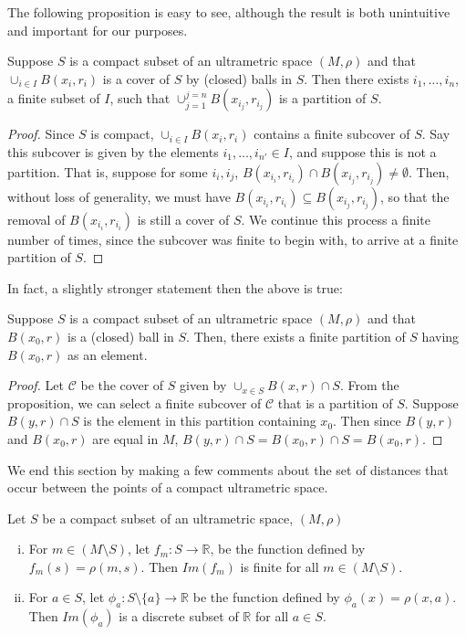The following proposition is  easy to see, although the result is both unintuitive and important for our purposes. \\

\begin{proposition}
Suppose $S$ is a compact subset of an ultrametric space $(M, \rho)$ and that $\cup_{i \in I} B(x_i,r_i)$ is a cover of $S$ by (closed) balls in $S$. Then there exists $i_1,\ldots, i_n$, a finite subset of $I$, such that  $\cup_{j=1}^{j=n} B(x_{i_j},r_{i_j})$ is a partition of $S$.
\end{proposition}

\begin{proof}
Since $S$ is compact, $\cup_{i \in I} B(x_i,r_i)$ contains a finite subcover of $S$. Say this subcover is given by the elements  $i_1,\ldots, i_{n'} \in I$, and suppose this is not a partition. That is, suppose for some $i_i, i_j$, $ B(x_{i_i},r_{i_i}) \cap  B(x_{i_j},r_{i_j}) \neq \emptyset$. Then, without loss of generality, we must have $ B(x_{i_i},r_{i_i}) \subseteq  B(x_{i_j},r_{i_j})$, so that the removal of $ B(x_{i_i},r_{i_i})$ is still a cover of $S$. We continue this process a finite number of times, since the subcover was finite to begin with, to arrive at a finite partition of $S$.
\end{proof}

In fact, a slightly stronger statement then the above is true:

\begin{corollary}
Suppose $S$ is a compact subset of an ultrametric space $(M, \rho)$ and that $B(x_0,r)$ is a (closed) ball in $S$. Then, there exists a finite partition of $S$ having $B(x_0,r)$ as an element.
\end{corollary}

\begin{proof}
Let $\mathcal{C}$ be the cover of $S$ given by $\cup_{x\in S} B(x,r) \cap S$. From the proposition, we can select a finite subcover of $\mathcal{C}$ that is a partition of $S$. Suppose $B(y,r) \cap S$ is the element in this partition containing $x_0$. Then  since $B(y,r)$ and $B(x_0,r)$ are equal in $M$, $B(y,r) \cap S = B(x_0,r) \cap S = B(x_0,r)$.
\end{proof}

We end this section by making a few comments about the set of distances that occur between the points of a compact ultrametric space.\\

\begin{proposition}
\cite{ar} Let $S$ be a compact subset of an ultrametric space, $(M, \rho)$
\begin{enumerate}[(i)]
\item For $m \in (M \setminus S)$, let $f_m:S \rightarrow \mathbb{R}$, be the function defined by $f_m(s) = \rho(m,s)$. Then $Im(f_m)$ is finite for all $m \in (M \setminus S)$.
\item For $a \in S$, let $\phi_a: S \setminus \{a\} \rightarrow \mathbb{R}$ be the function defined by $\phi_a(x)=\rho(x,a)$. Then $Im(\phi_a)$ is a discrete subset of $\mathbb{R}$ for all $a \in S$.
\end{enumerate}
\end{proposition}


